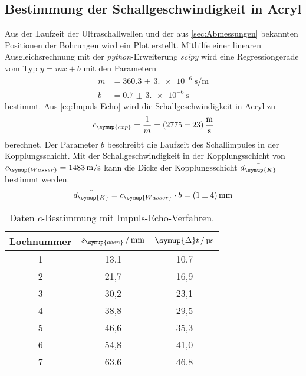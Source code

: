 \subsection{Bestimmung der Schallgeschwindigkeit in Acryl}
Aus der Laufzeit der Ultraschallwellen und der aus \ref{sec:Abmessungen} bekannten Positionen der Bohrungen wird ein Plot erstellt. Mithilfe einer 
linearen Ausgleichsrechnung mit der \textit{python}-Erweiterung \textit{scipy} \cite{scipy} wird eine Regressiongerade vom Typ $y=mx+b$ mit den
Parametern
\begin{align*}
    m &= \qty{360.3(3.0)e-6}{\second\per\metre} \\
    b &= \qty{0.7(3.0)e-6}{\second}
\end{align*}
bestimmt. Aus \eqref{eq:Impuls-Echo} wird die Schallgeschwindigkeit in Acryl zu
\begin{equation*}
    c_{\symup{exp}} = \frac{1}{m} = \qty{2775+-23}{\metre\per\second}
\end{equation*}
berechnet. Der Parameter $b$ beschreibt die Laufzeit des Schallimpules in der Kopplungsschicht. Mit der Schallgeschwindigkeit in der Kopplungsschicht
von $c_{\symup{Wasser}} = \qty{1483}{\metre\per\second}$ \cite{czichos} kann die Dicke der Kopplungsschicht $\tilde{d_{\symup{K}}}$ bestimmt werden.
\begin{equation*}
    \tilde{d_{\symup{K}}} = c_{\symup{Wasser}} \cdot b = \qty{1+-4}{\milli\metre}
\end{equation*}

\begin{table}[H]
    \centering
    \caption{Daten $c$-Bestimmung mit Impuls-Echo-Verfahren.}
    \label{tab:c-bestimmung}
    \begin{tabular}{S[table-format=1.0] S[table-format=2.1] S[table-format=2.1]}
        \toprule
         {Lochnummer} & {$s_{\symup{oben}}\,/\,\unit{\milli\metre}$} & {$\symup{\Delta}t\,/\,\unit{\micro\second}$} \\
        	& 13,1	& 10,7 \\
         2	& 21,7	& 16,9 \\
         3	& 30,2	& 23,1 \\
         4	& 38,8	& 29,5 \\
         5	& 46,6	& 35,3 \\
         6	& 54,8	& 41,0 \\
         7	& 63,6	& 46,8 \\ 
        \bottomrule 
    \end{tabular}
  \end{table}

